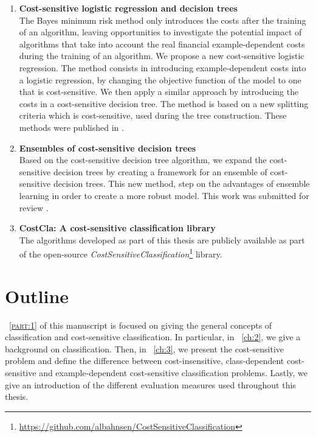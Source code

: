 \begin{enumerate}
\item \textbf{Cost-sensitive logistic regression and decision trees} \\
  The Bayes minimum risk method only introduces the costs after the training of an algorithm, leaving
  opportunities to investigate the potential impact of algorithms that take into account the real 
  financial example-dependent costs during the training of an algorithm. We propose a new 
  cost-sensitive logistic regression. The   method consists in introducing example-dependent costs 
  into a logistic regression, by  changing   the objective function of the model to one that is  
  cost-sensitive. We then apply a   similar approach by introducing the costs in a cost-sensitive 
  decision tree. The method is based on a new splitting criteria which is cost-sensitive, used 
  during the tree construction. 
  These methods were published in \citep{CorreaBahnsen2014b,CorreaBahnsen2015}.
  
\item \textbf{Ensembles of cost-sensitive decision trees} \\
  Based on the cost-sensitive decision tree algorithm, we expand the cost-sensitive decision trees
   by creating a framework for an ensemble of cost-sensitive decision trees. This new 
  method, step on the advantages of ensemble learning in order to create a more robust model.
  This work was submitted for review \citep{CorreaBahnsen2015b}.
  
\item \textbf{CostCla: A cost-sensitive classification library} \\
  The algorithms developed as part of this thesis are publicly available as part of the open-source 
  \textit{CostSensitiveClassification}\footnote{
  \url{https://github.com/albahnsen/CostSensitiveClassification}} library.
  
\end{enumerate}

\newpage

\section{Outline}

\partname{~\textsc{\ref{part:1}}} of this manuscript is focused on giving the general concepts of 
classification and cost-sensitive classification. In particular, in \chaptername{~\ref{ch:2}}, we 
give a background on classification. Then, in \chaptername{~\ref{ch:3}}, we present 
the cost-sensitive problem and define the difference between 
cost-insensitive, class-dependent cost-sensitive and example-dependent cost-sensitive 
classification problems. Lastly, we give an introduction of the different evaluation measures 
used throughout this thesis.

